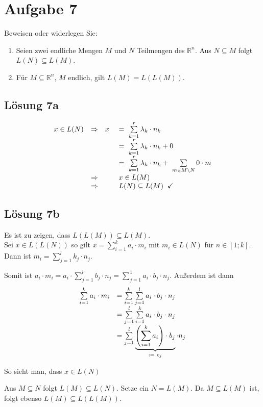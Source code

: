 \documentclass[main.tex]{subfiles}
\begin{document}
\section{Aufgabe 7}

Beweisen oder widerlegen Sie:
\begin{enumerate}
    \item Seien zwei endliche Mengen $M$ und $N$ Teilmengen des $\mathbb{R}^{n}$. Aus $N\subseteq M$ folgt $L( N) \subseteq L( M)$.
    \item Für $M\subseteq \mathbb{R}^{n}$, $M$ endlich, gilt $L( M) =L( L( M))$.
\end{enumerate}

\subsection{Lösung 7a}

\begin{equation*}
    \begin{array}{ c c r l }
    x\in L( N) & \Rightarrow  & x\  & =\ \sum\limits _{k=1}^{r} \lambda _{k} \cdotp n_{k}\\
     &  &  & =\ \sum\limits _{k=1}^{r} \lambda _{k} \cdotp n_{k} +0\\
     &  &  & =\ \sum\limits _{k=1}^{r} \lambda _{k} \cdotp n_{k} +\ \sum\limits _{m\in M\setminus N} 0\cdotp m\\
     & \Rightarrow  &  & x\in L( M)\\
     & \Rightarrow  &  & L( N) \subseteq L( M)\;\; \checked
    \end{array}
\end{equation*}
    

\subsection{Lösung 7b}
Es ist zu zeigen, dass $L(L(M)) \subseteq L(M)$.\\

Sei $x\in L( L( N))$ so gilt $x=\sum\limits _{i=1}^{k} a_{i} \cdotp m_{i}$ mit $m_{i} \in L( N)$ für $n\in [ 1;k]$. Dann ist $m_{i} =\sum\limits _{j=1}^{l} k_{j} \cdotp n_{j}$. 

Somit ist $a_{i} \cdotp m_{i} =a_{i} \cdotp \sum\limits _{j=1}^{l} b_{j} \cdotp n_{j} =\sum\limits _{j=1}^{1} a_{i} \cdotp b_{j} \cdotp n_{j}$. Außerdem ist dann
\begin{equation*}
    \begin{array}{ c l }
    \sum\limits _{i=1}^{k} a_{i} \cdotp m_{i} & =\sum\limits _{i=1}^{k}\sum\limits _{j=1}^{l} a_{i} \cdotp b_{j} \cdotp n_{j}\\
    & =\sum\limits _{j=1}^{l}\sum\limits _{i=1}^{k} a_{i} \cdotp b_{j} \cdotp n_{j}\\
    & =\sum\limits _{j=1}^{l}\underbrace{\left(\sum\limits _{i=1}^{k} a_{i}\right) \cdotp b_{j}}_{:=\ c_{j}} \cdotp n_{j}
    \end{array}
\end{equation*}

So sieht man, dass $x\in L( N)$ \checked

Aus $M\subseteq N$ folgt $L( M) \subseteq L( N)$. Setze ein $N=L( M)$. Da $M\subseteq L( M)$ ist, folgt ebenso $L( M) \subseteq L( L( M))$. \checked
\end{document}
